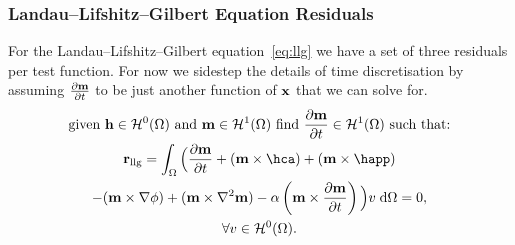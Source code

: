 


\subsubsection{Landau--Lifshitz--Gilbert Equation Residuals}

For the Landau--Lifshitz--Gilbert equation~\eqref{eq:llg} we have a set of three residuals per test function. For now we sidestep the details of time discretisation by assuming $\frac{\partial \mathbf{m}}{\partial t}$ to be just another function of $\mathbf{x}$ that we can solve for.
\begin{gather}
  \text{given $\hv \in \sob^0(\magd)$ and $\mv \in \sob^1(\magd)$ find $\dmdt \in \sob^1(\magd)$ such that:} \notag
  \\
  \mathbf{r}_{\text{llg}} = \int_\magd \Big( \dmdt
  + (\mv \times \hca) + (\mv \times \happ) \\
  - (\mv \times \nabla \phi) + (\mv \times \nabla^2 \mv)
  - \dampc \left( \mv \times \dmdt \right)
  \Big)  v \d\magd
  = 0, \label{res:contllg}
  \\
  \forall v \in \sob^0(\magd). \notag
\end{gather}

